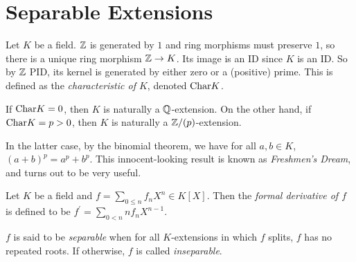 \documentclass[main.tex]{subfiles}
\begin{document}
\section{Separable Extensions}

\begin{dfn}  
  
  Let $K$ be a field. 
  $\mathbb{Z}$ is generated by $1$ and ring morphisms must preserve $1$, 
  so there is a unique ring morphism $\mathbb{Z} \to K$.
  Its image is an ID since $K$ is an ID.
  So by $\mathbb{Z}$ PID, its kernel is generated by either zero or a (positive) prime. 
  This is defined as the \emph{characteristic of $K$},
  denoted $\mathrm{Char}K$.
\end{dfn}

\begin{rmk} 
  If $\mathrm{Char}K = 0$, then $K$ is naturally a $\mathbb{Q}$-extension.
  On the other hand, if $\mathrm{Char}K = p > 0$, 
  then $K$ is naturally a $\mathbb{Z}/(p)$-extension. 

  In the latter case, by the binomial theorem, 
  we have for all $a, b \in K$, $(a + b)^p = a^p + b^p$. 
  This innocent-looking result is known as \emph{Freshmen's Dream},
  and turns out to be very useful. 
\end{rmk}

\begin{dfn} 
  
  Let $K$ be a field and $f = \sum_{0 \leq n} f_n X^n \in K[X]$. 
  Then the \emph{formal derivative of $f$} is defined to be 
  $f^\prime = \sum_{0 < n} n f_n X^{n-1}$. 

  $f$ is said to be \emph{separable} when 
  for all $K$-extensions in which $f$ splits, $f$ has no repeated roots. 
  If otherwise, $f$ is called \emph{inseparable}. 
\end{dfn}

\end{document}
